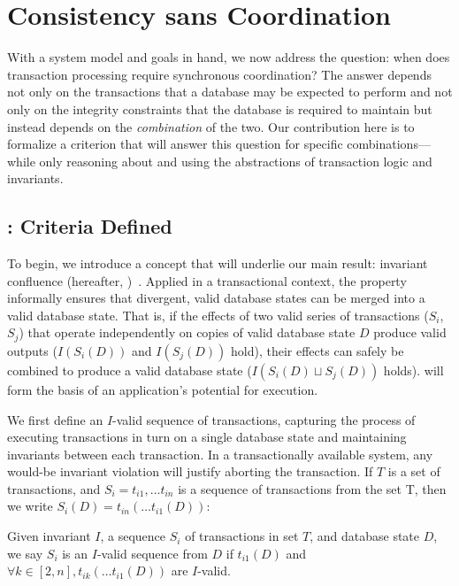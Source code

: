 
\section{Consistency sans Coordination}
\label{sec:bcc-theory}

With a system model and goals in hand, we now address the question:
when does transaction processing require synchronous coordination? The
answer depends not only on the transactions that a database may be
expected to perform and not only on the integrity constraints that the
database is required to maintain but instead depends on the
\textit{combination} of the two. Our contribution here is to formalize
a criterion that will answer this question for specific
combinations---while only reasoning about and using the abstractions
of transaction logic and invariants.

\subsection{\iconfluence: Criteria Defined}

To begin, we introduce a concept that will underlie our main result:
invariant confluence (hereafter,
\iconfluence)~\cite{obs-confluence}. Applied in a transactional
context, the \iconfluence property informally ensures that divergent,
valid database states can be merged into a valid database state. That
is, if the effects of two valid series of transactions ($S_i$, $S_j$)
that operate independently on copies of valid database state $D$
produce valid outputs ($I(S_i(D))$ and $I(S_j(D))$ hold), their
effects can safely be combined to produce a valid database state
($I(S_i(D) \sqcup S_j(D))$ holds). \iconfluence will form the basis of
an application's potential for \cfree execution.

We first define an $I$-valid sequence of transactions, capturing the
process of executing transactions in turn on a single database state
and maintaining invariants between each transaction. In a
transactionally available system, any would-be invariant violation
will justify aborting the transaction.  If $T$ is a set of
transactions, and $S_i = t_{i1},\dots t_{in}$ is a sequence of
transactions from the set T, then we write $S_i(D) = t_{in}(\dots
t_{i1}(D))$:

\begin{definition}
Given invariant $I$, a sequence $S_i$ of transactions in set $T$, and
database state $D$, we say $S_i$ is an $I$-valid sequence from $D$ if
$t_{i1}(D)$ and $\forall k \in [2, n], t_{ik}(\dots t_{i1}(D))$ are
$I$-valid.
\end{definition}

